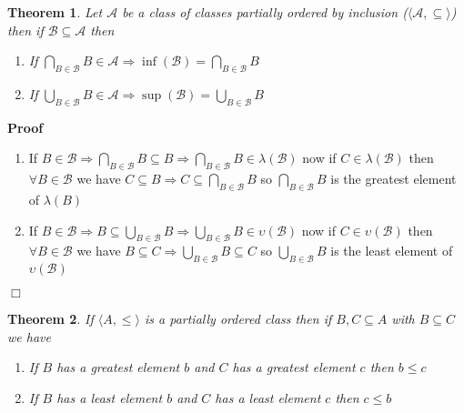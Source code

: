 \documentclass{book}
\newenvironment{proof}{\noindent\textbf{Proof\ }}{\hspace*{\fill}$\Box$\medskip}
\newtheorem{theorem}{Theorem}
\begin{document}
{{\begin{theorem}
  \label{inf, sup in class ordered by inclusion}Let $\mathcal{A}$ be a class
  of classes partially ordered by inclusion ($\langle \mathcal{A}, \subseteq
  \rangle$) then if $\mathcal{B} \subseteq \mathcal{A}$ then
  \begin{enumerate}
    \item If $\bigcap_{B \in \mathcal{B}} B \in \mathcal{A} \Rightarrow \inf
    (\mathcal{B}) = \bigcap_{B \in \mathcal{B}} B$
    
    \item If $\bigcup_{B \in \mathcal{B}} B \in \mathcal{A} \Rightarrow \sup
    (\mathcal{B}) = \bigcup_{B \in \mathcal{B}} B$
  \end{enumerate}
\end{theorem}

\begin{proof}
  
  \begin{enumerate}
    \item If $B \in \mathcal{B} \Rightarrow \bigcap_{B \in \mathcal{B}} B
    \subseteq B \Rightarrow \bigcap_{B \in \mathcal{B}} B \in \lambda
    (\mathcal{B})$ now if $C \in \lambda (\mathcal{B})$ then $\forall B \in
    \mathcal{B}$ we have $C \subseteq B \Rightarrow C \subseteq \bigcap_{B \in
    \mathcal{B}} B$ so $\bigcap_{B \in \mathcal{B}} B$ is the greatest element
    of $\lambda (B)$
    
    \item If $B \in \mathcal{B} \Rightarrow B \subseteq \bigcup_{B \in
    \mathcal{B}} B \Rightarrow \bigcup_{B \in \mathcal{B}} B \in \upsilon
    (\mathcal{B})$ now if $C \in \upsilon (\mathcal{B})$ then $\forall B \in
    \mathcal{B}$ we have $B \subseteq C \Rightarrow \bigcup_{B \in
    \mathcal{B}} B \subseteq C$ so $\bigcup_{B \in \mathcal{B}} B$ is the
    least element of $\upsilon (\mathcal{B})$
  \end{enumerate}
\end{proof}

\begin{theorem}
  \label{inclusion and greatest and least element}If $\langle A, \leqslant
  \rangle$ is a partially ordered class then if $B, C \subseteq A$ with $B
  \subseteq C$ we have
  \begin{enumerate}
    \item If $B$ has a greatest element $b$ and $C$ has a greatest element $c$
    then $b \leqslant c$
    
    \item If $B$ has a least element $b$ and $C$ has a least element $c$ then
    $c \leqslant b$
  \end{enumerate}
\end{theorem}

}}
\end{document}
